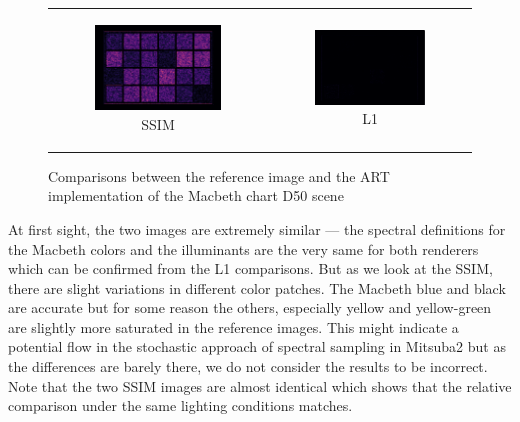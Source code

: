 \begin{figure}[h]
\begin{tabular}{cc}
\begin{subfigure}
			{0.4\textwidth}\centering\includegraphics[width=\linewidth]{img/macbeth_chart_D50_SSIM.png}
			\caption{SSIM}
		\end{subfigure} 
		&
		\begin{subfigure}
			{0.4\textwidth}\centering\includegraphics[width=\linewidth]{img/macbeth_chart_D50_L1.png}
			\caption{L1}
		\end{subfigure}
	\end{tabular}
	\caption{Comparisons between the reference image and the ART implementation of the Macbeth chart D50 scene}
	\label{fig:compare_macbeth_d50}
\end{figure}

At first sight, the two images are extremely similar --- the spectral definitions for the Macbeth colors and the illuminants are the very same for both renderers which can be confirmed from the L1 comparisons. But as we look at the SSIM, there are slight variations in different color patches. The Macbeth blue and black are accurate but for some reason the others, especially yellow and yellow-green are slightly more saturated in the reference images. This might indicate a potential flow in the stochastic approach of spectral sampling in Mitsuba2 but as the differences are barely there, we do not consider the results to be incorrect. Note that the two SSIM images are almost identical which shows that the relative comparison under the same lighting conditions matches.  

